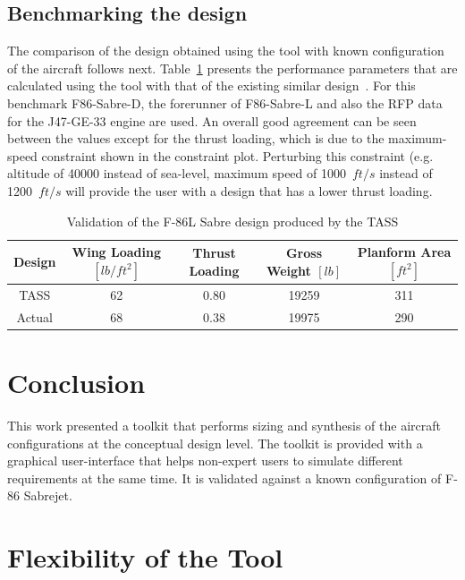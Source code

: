 \documentclass[pdftex,11pt,letter]{article}
\begin{document}
\subsection{Benchmarking the design}
The comparison of the design obtained using the tool with known configuration of the aircraft follows next. Table~\ref{tab:validation} presents the performance parameters that are calculated using the tool with that of the existing similar design~\cite{valid1,valid2}. For this benchmark F86-Sabre-D, the forerunner of F86-Sabre-L and also the  RFP data for the J47-GE-33 engine are used. An overall good agreement can be seen between the values except for the thrust loading, which is due to the maximum-speed constraint shown in the constraint plot. Perturbing this constraint (e.g. altitude of 40000 instead of sea-level, maximum speed of 1000~$ft/s$ instead of 1200~$ft/s$ will provide the user with a design that has a lower thrust loading.
\begin{table}[h]
\caption{Validation of the F-86L Sabre design produced by the TASS}
\centering 
\begin{tabular}{c| c c c c}
\hline\hline
Design & Wing Loading $[lb/ft^2]$ & Thrust Loading & Gross Weight $[lb]$ & Planform Area $[ft^2]$ \\
\hline\hline
TASS             & 62 &  0.80 & 19259 & 311 \\
Actual           & 68 &  0.38 & 19975 & 290 \\
\hline\hline
\end{tabular}
\label{tab:validation}
\end{table}

\section{Conclusion}\label{conclusion}

This work presented a toolkit that performs sizing and synthesis of the aircraft configurations at the conceptual design level. The toolkit is provided with a graphical user-interface that helps non-expert users to simulate different requirements at the same time. It is validated against a known configuration of F-86 Sabrejet.


	

\appendix

\section{Flexibility of the Tool}
\label{appendix:flexibility}
\end{document}
